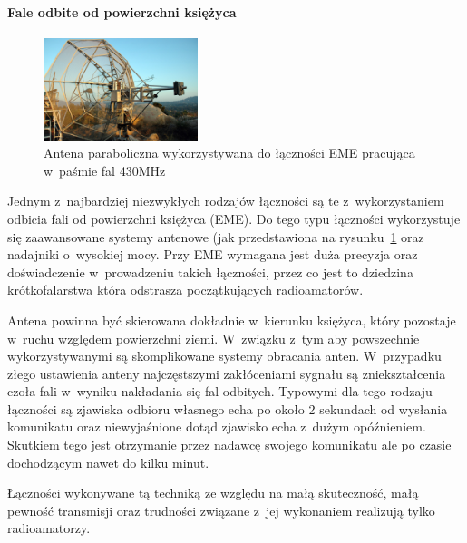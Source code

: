 \documentclass[eng,oneside]{mgr}
\begin{document}
					\paragraph{Fale odbite od powierzchni księżyca}
					\begin{figure}
						\vspace{-20pt}
						\begin{center}
							\includegraphics[width=0.4\textwidth]{eme_antenna}
						\end{center}
						\vspace{-20pt}
						\caption{Antena paraboliczna wykorzystywana do łączności EME pracująca w~paśmie fal 430MHz}
						\vspace{-10pt}
						\label{fig:eme_antenna}
					\end{figure}
					Jednym z~najbardziej niezwykłych rodzajów łączności są te z~wykorzystaniem odbicia fali od powierzchni księżyca (EME). Do tego typu łączności wykorzystuje się zaawansowane systemy antenowe (jak przedstawiona na rysunku~\ref{fig:eme_antenna} oraz nadajniki o~wysokiej mocy. Przy EME wymagana jest duża precyzja oraz doświadczenie w~prowadzeniu takich łączności, przez co jest to dziedzina krótkofalarstwa która odstrasza początkujących radioamatorów. 

					Antena powinna być skierowana dokładnie w~kierunku księżyca, który pozostaje w~ruchu względem powierzchni ziemi. W~związku z~tym aby powszechnie wykorzystywanymi są skomplikowane systemy obracania anten. W~przypadku złego ustawienia anteny najczęstszymi zakłóceniami sygnału są zniekształcenia czoła fali w~wyniku nakładania się fal odbitych. Typowymi dla tego rodzaju łączności są zjawiska odbioru własnego echa po około 2 sekundach od wysłania komunikatu oraz niewyjaśnione dotąd zjawisko echa z~dużym opóźnieniem. Skutkiem tego jest otrzymanie przez nadawcę swojego komunikatu ale po czasie dochodzącym nawet do kilku minut.

					Łączności wykonywane tą techniką ze względu na małą skuteczność, małą pewność transmisji oraz trudności związane z~jej wykonaniem realizują tylko radioamatorzy.
\end{document}

